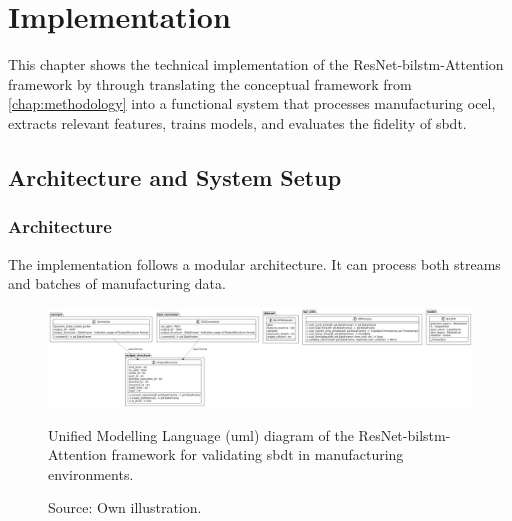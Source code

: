 \chapter{Implementation}
\label{chap:implementation}
This chapter shows the technical implementation of the ResNet-\gls{bilstm}-Attention framework by \textcite{Fischer2025ResNetBiLSTM} through translating the conceptual framework from \autoref{chap:methodology} into a functional system that processes manufacturing \gls{ocel}, extracts relevant features, trains models, and evaluates the fidelity of \gls{sbdt}.

\section{Architecture and System Setup}

\subsection{Architecture}
The implementation follows a modular architecture. It can process both streams and batches of manufacturing data.

\begin{figure}[htbp]
  \centering
  \includegraphics[width=1\textwidth]{figures/code.png}
  \caption[UML Diagram of the Implementation]{Unified Modelling Language (\gls{uml}) diagram of the ResNet-\gls{bilstm}-Attention framework for validating \gls{sbdt} in manufacturing environments.}
  \caption*{Source: Own illustration.}
  \label{fig:uml-diagram}
\end{figure}

